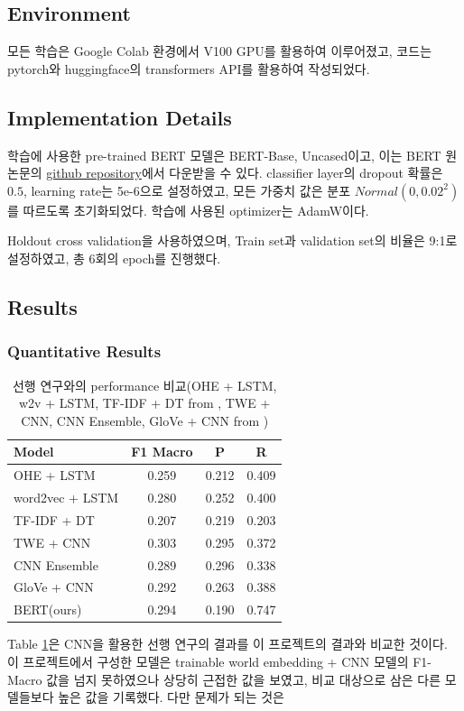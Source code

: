 \documentclass{article}
\begin{document}
\subsection{Environment}
모든 학습은 Google Colab 환경에서 V100 GPU를 활용하여 이루어졌고, 
코드는 pytorch와 huggingface의 transformers API를 활용하여 작성되었다.

\subsection{Implementation Details}
학습에 사용한 pre-trained BERT 모델은 BERT-Base, Uncased이고, 이는 BERT 원 논문의 \href{https://github.com/google-research/bert}{github repository}에서 다운받을 수 있다.
classifier layer의 dropout 확률은 $0.5$, learning rate는 5e-6으로 설정하였고, 모든 가중치 값은 분포 $Normal(0, 0.02^2)$를 따르도록 초기화되었다.
학습에 사용된 optimizer는 AdamW\cite{loshchilov2019decoupled}이다.

Holdout cross validation을 사용하였으며, Train set과 validation set의 비율은 9:1로 설정하였고, 총 6회의 epoch를 진행했다.

\subsection{Results}
\subsubsection{Quantitative Results}
\begin{table}[htb!]
    \begin{center}
        \begin{tabular}{lccc}\toprule
            Model & F1 Macro & P & R\\\midrule
            OHE + LSTM & 0.259 & 0.212 & 0.409\\
            word2vec + LSTM & 0.280 & 0.252 & 0.400\\
            TF-IDF + DT & 0.207 & 0.219 & 0.203\\
            TWE + CNN & 0.303 & 0.295 & 0.372 \\
            CNN Ensemble & 0.289 & 0.296 & 0.338 \\
            GloVe + CNN & 0.292 & 0.263 & 0.388 \\\midrule
            BERT(ours) & 0.294 & 0.190 & 0.747\\\bottomrule
        \end{tabular}
        \caption{선행 연구와의 performance 비교(OHE + LSTM, w2v + LSTM, TF-IDF + DT from \cite{iancu2019multilabel}, TWE + CNN, CNN Ensemble, GloVe + CNN from \cite{athavale2019})}
        \label{perf}
    \end{center}
\end{table}
Table \ref{perf}은 CNN을 활용한 선행 연구\cite{iancu2019multilabel,athavale2019}의 결과를 이 프로젝트의 결과와 비교한 것이다.
이 프로젝트에서 구성한 모델은 trainable world embedding + CNN 모델의 F1-Macro 값을 넘지 못하였으나 상당히 근접한 값을 보였고, 비교 대상으로 삼은 다른 모델들보다 높은 값을 기록했다.
다만 문제가 되는 것은 
\end{document}
